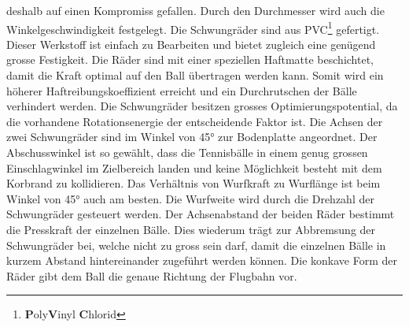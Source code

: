 deshalb auf einen Kompromiss gefallen. Durch den Durchmesser wird auch die Winkelgeschwindigkeit
festgelegt. Die Schwungräder sind aus PVC\footnote{\textbf{P}oly\textbf{V}inyl \textbf{C}hlorid}
gefertigt. Dieser Werkstoff ist einfach zu Bearbeiten und bietet zugleich eine genügend grosse
Festigkeit. Die Räder sind mit einer speziellen Haftmatte beschichtet, damit die Kraft optimal auf
den Ball übertragen werden kann. Somit wird ein höherer Haftreibungskoeffizient erreicht und ein
Durchrutschen der Bälle verhindert werden. Die Schwungräder besitzen grosses Optimierungspotential,
da die vorhandene Rotationsenergie der entscheidende Faktor ist. Die Achsen der zwei Schwungräder
sind im Winkel von 45° zur Bodenplatte angeordnet. Der Abschusswinkel ist so gewählt, dass die
Tennisbälle in einem genug grossen Einschlagwinkel im Zielbereich landen und keine Möglichkeit
besteht mit dem Korbrand zu kollidieren. Das Verhältnis von Wurfkraft zu Wurflänge ist beim Winkel
von 45° auch am besten. Die Wurfweite wird durch die Drehzahl der Schwungräder gesteuert werden. Der
Achsenabstand der beiden Räder bestimmt die Presskraft der einzelnen Bälle. Dies wiederum trägt zur
Abbremsung der Schwungräder bei, welche nicht zu gross sein darf, damit die einzelnen Bälle in
kurzem Abstand hintereinander zugeführt werden können. Die konkave Form der Räder gibt dem Ball die
genaue Richtung der Flugbahn vor.
	
	
	